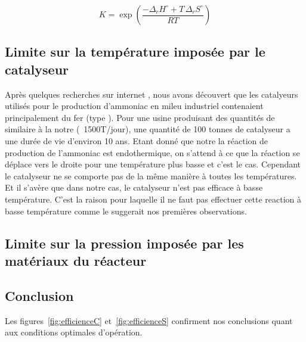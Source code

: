 \[
K = \exp{\left( \frac{- \Delta_r H^{\circ} + T \, \Delta_r S^{\circ}}{R T}\right)}
\]

\subsection{Limite sur la température imposée par le catalyseur}

Après quelques recherches sur internet \cite{catalyseur}, nous avons découvert que les catalyeurs utilisés
pour le production d'ammoniac en mileu industriel contenaient principalement du fer (type ). 
Pour une usine produisant des quantités de  similaire à la notre (~1500T/jour), une quantité de 100 tonnes
de catalyseur a une durée de vie d'environ 10 ans. Etant donné que notre la réaction de production de l'ammoniac est
endothermique, on s'attend à ce que la réaction se déplace vers le droite pour une température plus basse et c'est le cas.
Cependant le catalyseur ne se comporte pas de la m\^eme manière à toutes les températures. Et il s'avère que dans notre
cas, le catalyseur n'est pas efficace à basse température. C'est la raison pour laquelle il ne faut pas effectuer
cette reaction à basse température comme le suggerait nos premières observations.

\subsection{Limite sur la pression imposée par les matériaux du réacteur}

\subsection{Conclusion}

Les figures~\ref{fig:efficienceC} et~\ref{fig:efficienceS} confirment 
nos conclusions quant aux conditions optimales d'opération.

